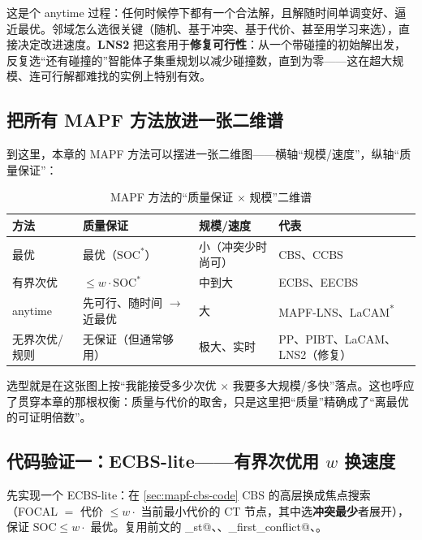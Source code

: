 这是个 anytime 过程：任何时候停下都有一个合法解，且解随时间单调变好、逼近最优。邻域怎么选很关键（随机、基于冲突、基于代价、甚至用学习来选），直接决定改进速度。\textbf{LNS2} 把这套用于\textbf{修复可行性}：从一个带碰撞的初始解出发，反复选“还有碰撞的”智能体子集重规划以减少碰撞数，直到为零——这在超大规模、连可行解都难找的实例上特别有效\cite{li2022lns2}。

\subsection{把所有 MAPF 方法放进一张二维谱}
\label{sec:mapf-2dspectrum}

到这里，本章的 MAPF 方法可以摆进一张二维图——横轴“规模/速度”，纵轴“质量保证”：

\begin{table}[H]\centering\small
\caption{MAPF 方法的“质量保证 $\times$ 规模”二维谱}
\label{tab:mapf-2d}
\begin{tabular}{llll}
\toprule
方法 & 质量保证 & 规模/速度 & 代表 \\
\midrule
最优 & 最优（$\mathrm{SOC}^*$） & 小（冲突少时尚可） & CBS、CCBS \\
有界次优 & $\le w\cdot\mathrm{SOC}^*$ & 中到大 & ECBS、EECBS \\
anytime & 先可行、随时间 $\to$ 近最优 & 大 & MAPF-LNS、LaCAM\textsuperscript{*} \\
无界次优/规则 & 无保证（但通常够用） & 极大、实时 & PP、PIBT、LaCAM、LNS2（修复） \\
\bottomrule
\end{tabular}
\end{table}

选型就是在这张图上按“我能接受多少次优 $\times$ 我要多大规模/多快”落点。这也呼应了贯穿本章的那根权衡：质量与代价的取舍，只是这里把“质量”精确成了“离最优的可证明倍数”。

\subsection{代码验证一：ECBS-lite——有界次优用 \texorpdfstring{$w$}{w} 换速度}
\label{sec:mapf-ecbs-code}

先实现一个 ECBS-lite：在 \cref{sec:mapf-cbs-code} CBS 的高层换成焦点搜索（FOCAL $=$ 代价 $\le w\cdot$ 当前最小代价的 CT 节点，其中选\textbf{冲突最少}者展开），保证 $\mathrm{SOC}\le w\cdot$ 最优。复用前文的 \verb@astar_st@、\verb@soc@、\verb@find_first_conflict@、\verb@pad@。

